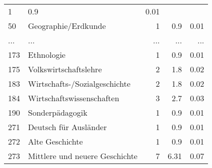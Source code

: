 \begin{longtable}{lXrrr}
          \num{1} &
          \num[round-mode=places,round-precision=2]{0,9} &
          \num[round-mode=places,round-precision=2]{0,01} \\
        50 & \multicolumn{1}{X}{Geographie/Erdkunde} & %
          \num{1} &
          \num[round-mode=places,round-precision=2]{0,9} &
          \num[round-mode=places,round-precision=2]{0,01} \\
       ... & ... & ... & ... & ... \\
        173 & \multicolumn{1}{X}{Ethnologie} & %
          \num{1} &
          \num[round-mode=places,round-precision=2]{0,9} &
          \num[round-mode=places,round-precision=2]{0,01} \\

        175 & \multicolumn{1}{X}{Volkswirtschaftslehre} & %
          \num{2} &
          \num[round-mode=places,round-precision=2]{1,8} &
          \num[round-mode=places,round-precision=2]{0,02} \\

        183 & \multicolumn{1}{X}{Wirtschafts-/Sozialgeschichte} & %
          \num{2} &
          \num[round-mode=places,round-precision=2]{1,8} &
          \num[round-mode=places,round-precision=2]{0,02} \\

        184 & \multicolumn{1}{X}{Wirtschaftswissenschaften} & %
          \num{3} &
          \num[round-mode=places,round-precision=2]{2,7} &
          \num[round-mode=places,round-precision=2]{0,03} \\

        190 & \multicolumn{1}{X}{Sonderpädagogik} & %
          \num{1} &
          \num[round-mode=places,round-precision=2]{0,9} &
          \num[round-mode=places,round-precision=2]{0,01} \\

        271 & \multicolumn{1}{X}{Deutsch für Ausländer} & %
          \num{1} &
          \num[round-mode=places,round-precision=2]{0,9} &
          \num[round-mode=places,round-precision=2]{0,01} \\

        272 & \multicolumn{1}{X}{Alte Geschichte} & %
          \num{1} &
          \num[round-mode=places,round-precision=2]{0,9} &
          \num[round-mode=places,round-precision=2]{0,01} \\

        273 & \multicolumn{1}{X}{Mittlere und neuere Geschichte} & %
          \num{7} &
          \num[round-mode=places,round-precision=2]{6,31} &
          \num[round-mode=places,round-precision=2]{0,07} \\


\end{longtable}
